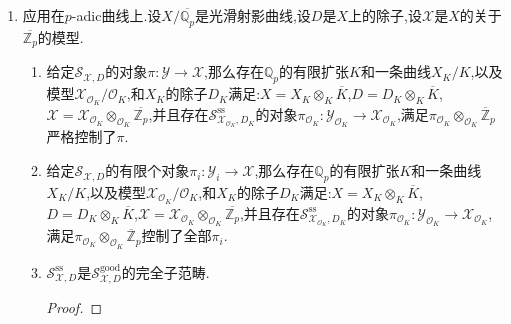 \begin{enumerate}
\begin{enumerate}[(1)]
\begin{proof}
        	因为按照上一条可以找到有限扩张$R'_i/R$使得$\pi_i\otimes_RR'_i$被$\mathcal{S}_{\mathcal{X}'_i,D'_i}^{\mathrm{ss}}$中的$\pi_i'$控制.可以取足够大的有限扩张$R'/R$包含了所有$R'_i$,那么$\pi_i\otimes_RR'$被$\mathcal{S}_{\mathcal{X}',D'}$中的$\pi_i'\otimes_{R'_i}R$控制.再取这些$\{\pi_i'\otimes_{R_i'}R\}$的纤维积,它落在$\mathcal{S}_{\mathcal{X}',D'}$中并且控制了全部$\pi_i\otimes_RR'$.
        \end{proof}
    \end{enumerate}
    \item 应用在$p$-adic曲线上.设$X/\overline{\mathbb{Q}_p}$是光滑射影曲线,设$D$是$X$上的除子,设$\mathcal{X}$是$X$的关于$\overline{\mathbb{Z}_p}$的模型.
    \begin{enumerate}[(1)]
    	\item 给定$\mathcal{S}_{\mathcal{X},D}$的对象$\pi:\mathcal{Y}\to\mathcal{X}$,那么存在$\mathbb{Q}_p$的有限扩张$K$和一条曲线$X_K/K$,以及模型$\mathcal{X}_{\mathscr{O}_K}/\mathscr{O}_K$,和$X_K$的除子$D_K$满足:$X=X_K\otimes_K\overline{K}$,$D=D_K\otimes_K\overline{K}$,$\mathcal{X}=\mathcal{X}_{\mathscr{O}_K}\otimes_{\mathscr{O}_K}\overline{\mathbb{Z}_p}$,并且存在$\mathcal{S}_{\mathcal{X}_{\mathscr{O}_K},D_K}^{\mathrm{ss}}$的对象$\pi_{\mathscr{O}_K}:\mathcal{Y}_{\mathscr{O}_K}\to\mathcal{X}_{\mathscr{O}_K}$,满足$\pi_{\mathscr{O}_K}\otimes_{\mathscr{O}_K}\overline{\mathbb{Z}}_p$严格控制了$\pi$.
        \item 给定$\mathcal{S}_{\mathcal{X},D}$的有限个对象$\pi_i:\mathcal{Y}_i\to\mathcal{X}$,那么存在$\mathbb{Q}_p$的有限扩张$K$和一条曲线$X_K/K$,以及模型$\mathcal{X}_{\mathscr{O}_K}/\mathscr{O}_K$,和$X_K$的除子$D_K$满足:$X=X_K\otimes_K\overline{K}$,$D=D_K\otimes_K\overline{K}$,$\mathcal{X}=\mathcal{X}_{\mathscr{O}_K}\otimes_{\mathscr{O}_K}\overline{\mathbb{Z}_p}$,并且存在$\mathcal{S}_{\mathcal{X}_{\mathscr{O}_K},D_K}^{\mathrm{ss}}$的对象$\pi_{\mathscr{O}_K}:\mathcal{Y}_{\mathscr{O}_K}\to\mathcal{X}_{\mathscr{O}_K}$,满足$\pi_{\mathscr{O}_K}\otimes_{\mathscr{O}_K}\overline{\mathbb{Z}}_p$控制了全部$\pi_i$.
        \item $\mathcal{S}_{\mathcal{X},D}^{\mathrm{ss}}$是$\mathcal{S}_{\mathcal{X},D}^{\mathrm{good}}$的完全子范畴.
        \begin{proof}
        	

\end{proof}
\end{enumerate}
\end{enumerate}
